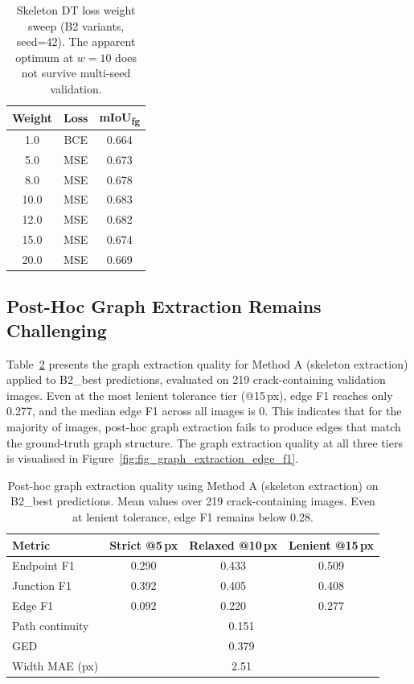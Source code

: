 \documentclass[preprint,12pt]{elsarticle}
\begin{document}
\begin{table}[t]
\centering
\caption{Skeleton DT loss weight sweep (B2 variants, seed=42). The apparent optimum at $w{=}10$ does not survive multi-seed validation.}
\label{tab:dt_weight_sweep}
\begin{tabular}{ccc}
\toprule
Weight & Loss & mIoU\textsubscript{fg} \\
\midrule
1.0 & BCE & 0.664 \\
5.0 & MSE & 0.673 \\
8.0 & MSE & 0.678 \\
10.0 & MSE & 0.683 \\
12.0 & MSE & 0.682 \\
15.0 & MSE & 0.674 \\
20.0 & MSE & 0.669 \\
\bottomrule
\end{tabular}
\end{table}


\subsection{Post-Hoc Graph Extraction Remains Challenging}
\label{sec:results_graph}

Table~\ref{tab:graph_extraction} presents the graph extraction quality for Method A (skeleton extraction) applied to B2\_best predictions, evaluated on 219 crack-containing validation images. Even at the most lenient tolerance tier (@15\,px), edge F1 reaches only 0.277, and the median edge F1 across all images is 0. This indicates that for the majority of images, post-hoc graph extraction fails to produce edges that match the ground-truth graph structure. The graph extraction quality at all three tiers is visualised in Figure~\ref{fig:fig_graph_extraction_edge_f1}.

\begin{table}[t]
\centering
\caption{Post-hoc graph extraction quality using Method A (skeleton extraction) on B2\_best predictions. Mean values over 219 crack-containing images. Even at lenient tolerance, edge F1 remains below 0.28.}
\label{tab:graph_extraction}
\begin{tabular}{lccc}
\toprule
Metric & Strict @5\,px & Relaxed @10\,px & Lenient @15\,px \\
\midrule
Endpoint F1 & 0.290 & 0.433 & 0.509 \\
Junction F1 & 0.392 & 0.405 & 0.408 \\
Edge F1 & 0.092 & 0.220 & 0.277 \\
\midrule
Path continuity & \multicolumn{3}{c}{0.151} \\
GED & \multicolumn{3}{c}{0.379} \\
Width MAE (px) & \multicolumn{3}{c}{2.51} \\
\bottomrule
\end{tabular}
\end{table}
\end{document}

